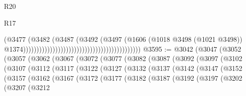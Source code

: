 \begin{lexlean}{R20}
\begin{lexlean}{R17}
\begin{coremodule}
{{{{{{{{{{{{{{{{{{{{{{{{{{{{{{{{{{{{{{{{{{{{{{{{{{{{{{{{{{{{{{{{{{{{{{{{{{{{{{{{{{{{{{{{{{{{{{{{{{{{{{{{{{{                                                                                (@3477
                                                                                  (@3482
                                                                                    (@3487
                                                                                      (@3492
                                                                                        (@3497
                                                                                          (@1606
                                                                                            (@1018
                                                                                              @3498
                                                                                              (@1021
                                                                                                @3498))
                                                                                            @1374))))))))))))))))))))))))))))))))))))))))))))
@3595 := @3042
    (@3047
      (@3052
        (@3057
          (@3062
            (@3067
              (@3072
                (@3077
                  (@3082
                    (@3087
                      (@3092
                        (@3097
                          (@3102
                            (@3107
                              (@3112
                                (@3117
                                  (@3122
                                    (@3127
                                      (@3132
                                        (@3137
                                          (@3142
                                            (@3147
                                              (@3152
                                                (@3157
                                                  (@3162
                                                    (@3167
                                                      (@3172
                                                        (@3177
                                                          (@3182
                                                            (@3187
                                                              (@3192
                                                                (@3197
                                                                  (@3202
                                                                    (@3207
                                                                      (@3212
}}}}}}}}}}}}}}}}}}}}}}}}}}}}}}}}}}}}}}}}}}}}}}}}}}}}}}}}}}}}}}}}}}}}}}}}}}}}}}}}}}}}}}}}}}}}}}}}}}}}}}}}}}}
\end{coremodule}
\end{lexlean}
\end{lexlean}
